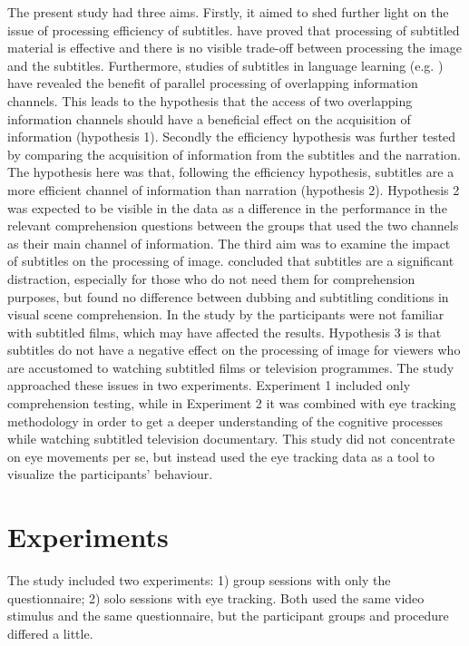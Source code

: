 \documentclass[output=paper]{langsci/langscibook}
\begin{document}
The present study had three aims. Firstly, it aimed to shed further light on the issue of processing efficiency of subtitles. \citet{Perego2010} have proved that processing of subtitled material is effective and there is no visible trade-off between processing the image and the subtitles. Furthermore, studies of subtitles in language learning (e.g. \citet{mitterer2009}) have revealed the benefit of parallel processing of overlapping information channels. This leads to the hypothesis that the access of two overlapping information channels should have a beneficial effect on the acquisition of information (hypothesis 1). Secondly the efficiency hypothesis \citep{dydewalle1987} was further tested by comparing the acquisition of information from the subtitles and the narration. The hypothesis here was that, following the efficiency hypothesis, subtitles are a more efficient channel of information than narration (hypothesis 2). Hypothesis 2 was expected to be visible in the data as a difference in the performance in the relevant comprehension questions between the groups that used the two channels as their main channel of information. The third aim was to examine the impact of subtitles on the processing of image. \citet{lavaur2011} concluded that subtitles are a significant distraction, especially for those who do not need them for comprehension purposes, but \citet{Perego2010} found no difference between dubbing and subtitling conditions in visual scene comprehension. In the study by \citet{lavaur2011} the participants were not familiar with subtitled films, which may have affected the results. Hypothesis 3 is that subtitles do not have a negative effect on the processing of image for viewers who are accustomed to watching subtitled films or television programmes. The study approached these issues in two experiments. Experiment 1 included only comprehension testing, while in Experiment 2 it was combined with eye tracking methodology in order to get a deeper understanding of the cognitive processes while watching subtitled television documentary. This study did not concentrate on eye movements per se, but instead used the eye tracking data as a tool to visualize the participants’ behaviour.

\section{Experiments}

The study included two experiments: 1) group sessions with only the questionnaire; 2) solo sessions with eye tracking. Both used the same video stimulus and the same questionnaire, but the participant groups and procedure differed a little. 
\end{document}
